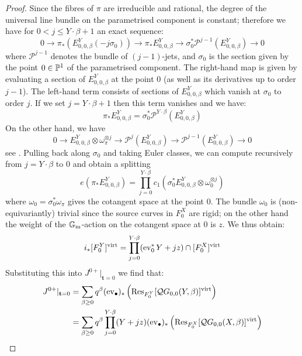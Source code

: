 \begin{proof}
Since the fibres of $\pi$ are irreducible and rational, the degree of the universal line bundle on the parametrised component is constant; therefore we have for $0 < j \leq Y\cdot\beta + 1$ an exact sequence:
\begin{equation*} 0 \to \pi_* (E^Y_{0,0,\beta}(-j\sigma_0)) \to \pi_* E^Y_{0,0,\beta} \to \sigma_0^*\mathcal{P}^{j-1}(E^Y_{0,0,\beta}) \to 0 \end{equation*}
where $\mathcal{P}^{j-1}$ denotes the bundle of $(j-1)$-jets, and $\sigma_{0}$ is the section given by the point $0 \in \mathbb P^1$ of the parametrised component. The right-hand map is given by evaluating a section of $E_{0,0,\beta}^Y$ at the point $0$ (as well as its derivatives up to order $j-1$). The left-hand term consists of sections of $E_{0,0,\beta}^Y$ which vanish at $\sigma_0$ to order $j$. If we set $j=Y\cdot\beta+1$ then this term vanishes and we have:
\begin{equation*} \pi_* E_{0,0,\beta}^Y = \sigma_0^* \mathcal{P}^{Y\cdot\beta}(E_{0,0,\beta}^Y) \end{equation*}
On the other hand, we have
\begin{equation*} 0 \to E^Y_{0,0,\beta} \otimes \omega_\pi^{\otimes j} \to \mathcal{P}^{j}(E^Y_{0,0,\beta}) \to \mathcal{P}^{j-1}(E^Y_{0,0,\beta}) \to 0
\end{equation*}
see \cite[\S 2]{Ga}. Pulling back along $\sigma_0$ and taking Euler classes, we can compute recursively from $j = Y \cdot \beta$ to $0$ and obtain a splitting
\begin{equation*}
e(\pi_* E^Y_{0,0,\beta})=\prod_{j=0}^{Y\cdot\beta} c_1(\sigma_0^* E^Y_{0,0,\beta}\otimes \omega_{0}^{\otimes j})
\end{equation*}
where $\omega_0=\sigma_0^*\omega_\pi$ gives the cotangent space at the point $0$. The bundle $\omega_0$ is (non-equivariantly) trivial since the source curves in $F_0^X$ are rigid; on the other hand the weight of the $\mathbb{G}_{\text{m}}$-action on the cotangent space at $0$ is $z$. We thus obtain:
\begin{equation*} i_*[F_0^Y]^{\operatorname{virt}}=\prod_{j=0}^{Y\cdot\beta}(\operatorname{ev}_0^* Y+jz)\cap [F_0^X]^{\operatorname{virt}} \end{equation*}
Substituting this into $J^{0+}|_{\mathbf{t}=0}$ we find that:
\begin{align*} {J^{0+}}|_{{\mathbf{t}=0}} & = \sum_{\beta\geq 0}q^\beta(\operatorname{ev}_\bullet)_* \left( \operatorname{Res}_{F_0^Y}[\mathcal{Q}G_{0,0}(Y,\beta)]^{\operatorname{virt}} \right) \\
& = \sum_{\beta \geq 0} q^\beta \prod_{j=0}^{Y \cdot \beta} (Y + jz) (\operatorname{ev}_{\bullet})_* \left( \operatorname{Res}_{F_0^X}[\mathcal{Q}G_{0,0}(X,\beta)]^{\operatorname{virt}} \right) \end{align*}

\end{proof}
